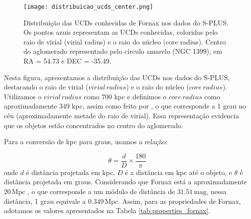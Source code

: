 \begin{figure}[!ht]
    \begin{center}
    \texttt{[image: distribuicao\_ucds\_center.png]}
    \caption[]{Distribuição das UCDs conhecidas de Fornax nos dados do S-PLUS. Os pontos azuis representam as UCDs conhecidas, coloridas pelo raio de virial (virial radius) e o raio do núcleo (core radius). Centro do aglomerado representado pelo círculo amarelo (NGC 1399), em \ac{RA} = 54.73 e \ac{DEC} = -35.49.}
    \label{distribuicao_ucds_center}
    \end{center}
\end{figure}

Nesta figura, apresentamos a distribuição das UCDs nos dados do S-PLUS, destacando o raio de virial ($virial \, radius$) e o raio do núcleo ($core \, radius$). Utilizamos o $virial \, radius$ como 700 kpc \citep{Drinkwater_2001} e definimos o $core \, radius$ como aproximadamente 349 kpc, assim como feito por \cite{Saifollahi_2021}, o que corresponde a 1 grau no céu (aproximadamente metade do raio de virial). Essa representação evidencia que os objetos estão concentrados no centro do aglomerado.

Para a conversão de kpc para graus, usamos a relação:

\begin{equation}
    \theta = \frac{d}{D} \times \frac{180}{\pi}
\end{equation}
onde $d$ é distância projetada em kpc, $D$ é a distância em kpc até o objeto, e $\theta$ é distância projetada em graus. Considerando que Fornax está a aproximadamente $20 \, \text{Mpc}$ \citep{Blakeslee_2009}, o que corresponde a um módulo de distância de $31.51 \, \text{mag}$, nessa distância, 1 grau equivale a $0.349 \, \text{Mpc}$. Assim, para as propriedades de Fornax, adotamos os valores apresentados na Tabela \ref{tab:properties_fornax}.




